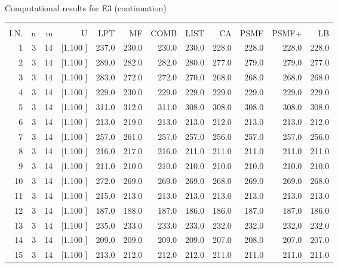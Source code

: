 \documentclass[12pt,a4paper]{article}
\begin{document}
\newpage
\begin{center}
 Computational results for E3 (continuation) {\tiny
\begin{tabular}{r r r r r r r r r r r r}\hline
    &   &   &          &        &        &        &        &        &        &        &       \\[-0.1in]
  I.N.  &  n  &  m  &  U  &  LPT  &  MF  &  COMB  &  LIST  &  CA  & PSMF &PSMF+ & LB \\[0.03in]
\hline
   1&  3& 14&[1.100     ]&   237.0&   230.0&   230.0&   230.0&   228.0&   228.0&   228.0&   228.0\\[-0.02in]
   2&  3& 14&[1.100     ]&   289.0&   282.0&   282.0&   280.0&   277.0&   279.0&   279.0&   277.0\\[-0.02in]
   3&  3& 14&[1.100     ]&   283.0&   272.0&   272.0&   270.0&   268.0&   268.0&   268.0&   268.0\\[-0.02in]
   4&  3& 14&[1.100     ]&   229.0&   230.0&   229.0&   229.0&   229.0&   229.0&   229.0&   229.0\\[-0.02in]
   5&  3& 14&[1.100     ]&   311.0&   312.0&   311.0&   308.0&   308.0&   308.0&   308.0&   308.0\\[-0.02in]
   6&  3& 14&[1.100     ]&   213.0&   219.0&   213.0&   213.0&   212.0&   213.0&   213.0&   212.0\\[-0.02in]
   7&  3& 14&[1.100     ]&   257.0&   261.0&   257.0&   257.0&   256.0&   257.0&   257.0&   256.0\\[-0.02in]
   8&  3& 14&[1.100     ]&   216.0&   217.0&   216.0&   211.0&   211.0&   211.0&   211.0&   211.0\\[-0.02in]
   9&  3& 14&[1.100     ]&   211.0&   210.0&   210.0&   210.0&   210.0&   210.0&   210.0&   210.0\\[-0.02in]
  10&  3& 14&[1.100     ]&   272.0&   269.0&   269.0&   269.0&   268.0&   269.0&   269.0&   268.0\\[-0.02in]
  11&  3& 14&[1.100     ]&   215.0&   213.0&   213.0&   213.0&   213.0&   213.0&   213.0&   213.0\\[-0.02in]
  12&  3& 14&[1.100     ]&   187.0&   188.0&   187.0&   186.0&   186.0&   187.0&   187.0&   186.0\\[-0.02in]
  13&  3& 14&[1.100     ]&   235.0&   233.0&   233.0&   233.0&   232.0&   232.0&   232.0&   232.0\\[-0.02in]
  14&  3& 14&[1.100     ]&   209.0&   209.0&   209.0&   209.0&   207.0&   208.0&   207.0&   207.0\\[-0.02in]
  15&  3& 14&[1.100     ]&   213.0&   212.0&   212.0&   212.0&   211.0&   211.0&   211.0&   211.0\\[-0.02in]

\end{tabular}}
\end{center}
\end{document}
